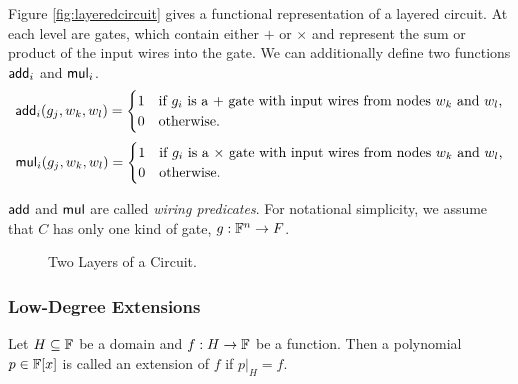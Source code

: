 Figure \ref{fig:layeredcircuit} gives a functional representation of a layered circuit. At each level are gates, which contain either $+$ or $\times$ and represent the sum or product of the input wires into the gate. We can additionally define two functions $\mathsf{add}_i$ and $\mathsf{mul}_i$.
\begin{align*}
	\mathsf{add}_i(g_j,w_k,w_l)=
	\begin{cases}
		1&\text{if $g_i$ is a $+$ gate with input wires from nodes $w_k$ and $w_l$,}\\
		0&\text{otherwise.}
	\end{cases}
\end{align*}
\begin{align*}
	\mathsf{mul}_i(g_j,w_k,w_l)=
	\begin{cases}
		1&\text{if $g_i$ is a $\times$ gate with input wires from nodes $w_k$ and $w_l$,}\\
		0&\text{otherwise.}
	\end{cases}
\end{align*}

$\mathsf{add}$ and $\mathsf{mul}$ are called \textit{wiring predicates}. For notational simplicity, we assume that $C$ has only one kind of gate, $g:\mathbb{F}^n\rightarrow F$.

\begin{figure}[h]
	\centering
	\caption{Two Layers of a Circuit.}
\end{figure}

\subsubsection{Low-Degree Extensions}

\begin{definition}
	Let $H\subseteq\mathbb{F}$ be a domain and $f:H\rightarrow\mathbb{F}$ be a function. Then a polynomial $p\in\mathbb{F}[x]$ is called an extension of $f$ if $p|_H=f$.
\end{definition}


